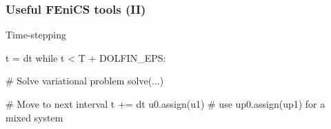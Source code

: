 \begin{frame}[fragile]
  \frametitle{Useful FEniCS tools (II)}

  Time-stepping
  \vspace{-0.5cm}
\begin{python}
t = dt
while t < T + DOLFIN_EPS:

    # Solve variational problem
    solve(...)

    # Move to next interval
    t += dt
    u0.assign(u1)
    # use up0.assign(up1) for a mixed system
\end{python}

\end{frame}
